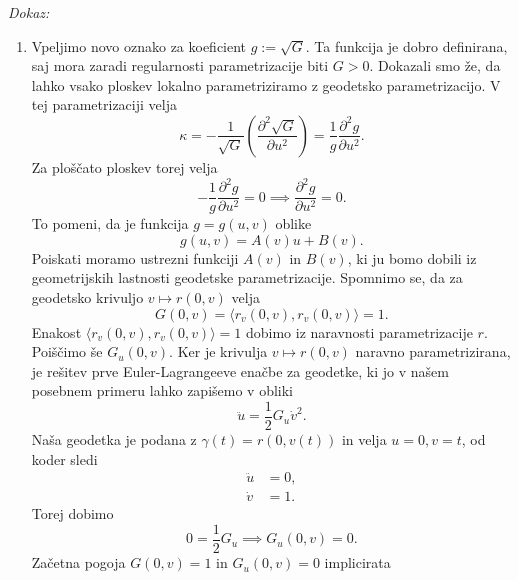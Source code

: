 \noindent
{\em Dokaz:\/}
\begin{enumerate}
    \item Vpeljimo novo oznako za koeficient $g := \sqrt{G}$. Ta funkcija je dobro definirana, saj mora zaradi regularnosti parametrizacije biti $G > 0$. Dokazali smo že, da lahko vsako ploskev lokalno parametriziramo z geodetsko parametrizacijo. V tej parametrizaciji velja \begin{equation*}
        \kappa = - \frac{1}{\sqrt{G}} \left( \frac{ \partial^{2} \sqrt{G}  }{ \partial u^{2} }  \right) = \frac{1}{g} \frac{ \partial^{2} g }{ \partial u^{2} } .
        \end{equation*}  
        Za ploščato ploskev torej velja \begin{equation*}
        -\frac{1}{g} \frac{ \partial^{2} g }{ \partial u^{2} } = 0 \implies \frac{ \partial^{2} g }{ \partial u^{2} } = 0. 
        \end{equation*}
        To pomeni, da je funkcija $g = g(u,v)$ oblike \begin{equation*}
        g(u,v) = A(v) u + B(v).
        \end{equation*}  
        Poiskati moramo ustrezni funkciji $A(v)$ in $B(v)$, ki ju bomo dobili iz geometrijskih lastnosti geodetske parametrizacije. Spomnimo se, da za
        geodetsko krivuljo $v \mapsto r(0,v)$ velja \begin{equation*}
        G(0, v) = \langle r_v(0,v), r_v(0,v) \rangle = 1. 
        \end{equation*}  
        Enakost $\langle r_v(0,v), r_v(0,v) \rangle = 1$ dobimo iz naravnosti parametrizacije $r$. Poiščimo še $G_u(0, v)$. Ker je krivulja
        $v \mapsto  r(0, v)$ naravno parametrizirana, je rešitev prve Euler-Lagrangeeve enačbe za geodetke, ki jo v našem posebnem primeru lahko zapišemo v obliki \begin{equation*}
        \ddot{u} = \frac{1}{2} G_u \dot{v}^2. 
        \end{equation*}  
        Naša geodetka je podana z $\gamma(t) = r(0, v(t))$ in velja $u = 0, v = t$, od koder sledi \begin{align*}
            \ddot{u} &= 0, \\
            \dot{v} &= 1.
        \end{align*}
        Torej dobimo \begin{equation*}
        0 = \frac{1}{2} G_u \implies G_u(0,v) = 0.
        \end{equation*}  
        Začetna pogoja $G(0, v) = 1$ in $G_u(0,v) = 0$ implicirata \begin{align*}

\end{align*}
\end{enumerate}
